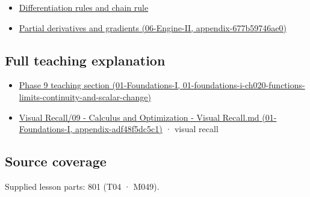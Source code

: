 \begin{itemize}
\tightlist
\item
  \hyperref[appendix-d9f70bdfbc92]{Differentiation rules and chain rule}
\item
  \href{../06-Engine-II/main.pdf\#nameddest=appendix-677b59746ae0}{Partial derivatives and gradients (06-Engine-II, appendix-677b59746ae0)}
\end{itemize}

\subsection{Full teaching explanation}\label{appendix-a59658325cd6-full-teaching-explanation}

\begin{itemize}
\tightlist
\item
  \href{../01-Foundations-I/main.pdf\#nameddest=01-foundations-i-ch020-functions-limits-continuity-and-scalar-change}{Phase 9 teaching section (01-Foundations-I, 01-foundations-i-ch020-functions-limits-continuity-and-scalar-change)}
\item
  \href{../01-Foundations-I/main.pdf\#nameddest=appendix-adf48f5dc5c1}{Visual Recall/09 - Calculus and Optimization - Visual Recall.md (01-Foundations-I, appendix-adf48f5dc5c1)} · visual recall
\end{itemize}

\subsection{Source coverage}\label{appendix-a59658325cd6-source-coverage}

Supplied lesson parts: 801 (T04 · M049).
